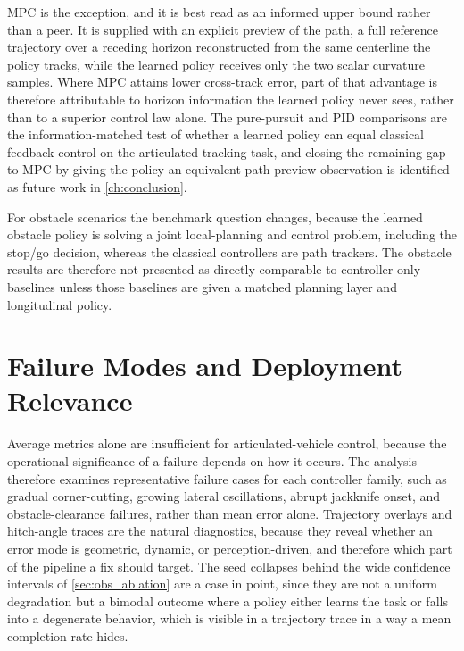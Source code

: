 MPC is the exception, and it is best read as an informed upper bound rather than a peer. It is supplied with an explicit preview of the path, a full reference trajectory over a receding horizon reconstructed from the same centerline the policy tracks, while the learned policy receives only the two scalar curvature samples. Where MPC attains lower cross-track error, part of that advantage is therefore attributable to horizon information the learned policy never sees, rather than to a superior control law alone. The pure-pursuit and PID comparisons are the information-matched test of whether a learned policy can equal classical feedback control on the articulated tracking task, and closing the remaining gap to MPC by giving the policy an equivalent path-preview observation is identified as future work in \cref{ch:conclusion}.

For obstacle scenarios the benchmark question changes, because the learned obstacle policy is solving a joint local-planning and control problem, including the stop/go decision, whereas the classical controllers are path trackers. The obstacle results are therefore not presented as directly comparable to controller-only baselines unless those baselines are given a matched planning layer and longitudinal policy.

\section{Failure Modes and Deployment Relevance}
\label{sec:failure_analysis}

Average metrics alone are insufficient for articulated-vehicle control, because the operational significance of a failure depends on how it occurs. The analysis therefore examines representative failure cases for each controller family, such as gradual corner-cutting, growing lateral oscillations, abrupt jackknife onset, and obstacle-clearance failures, rather than mean error alone. Trajectory overlays and hitch-angle traces are the natural diagnostics, because they reveal whether an error mode is geometric, dynamic, or perception-driven, and therefore which part of the pipeline a fix should target. The seed collapses behind the wide confidence intervals of \cref{sec:obs_ablation} are a case in point, since they are not a uniform degradation but a bimodal outcome where a policy either learns the task or falls into a degenerate behavior, which is visible in a trajectory trace in a way a mean completion rate hides.

